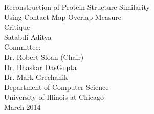 \documentclass{report}
\begin{document}
\begin{titlepage}
\vspace*{\fill}
\begin{center}
{\LARGE Reconstruction of Protein Structure Similarity \\Using Contact Map Overlap Measure}\\[0.5in]

{\large Critique}\\[0.1in]
{\large Satabdi Aditya}\\[0.5in]


{\large Committee:}\\[0.1in]
{\large Dr. Robert Sloan (Chair)}\\[0.05in]
{\large Dr. Bhaskar DasGupta}\\[0.05in]
{\large Dr. Mark Grechanik}\\[0.05in]

\vfill
{\large Department of Computer Science}\\[0.05in]
{\large University of Illinois at Chicago}\\[0.1in]
{\large March 2014}
\end{center}
\vspace*{\fill}
\end{titlepage}


\tableofcontents





\cleardoublepage
{}
{}


\end{document}
